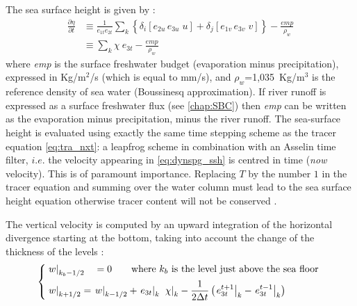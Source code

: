 \documentclass[../tex_main/NEMO_manual]{subfiles}
\begin{document}
The sea surface height is given by :
\begin{equation} \label{eq:dynspg_ssh}
\begin{aligned}
\frac{\partial \eta }{\partial t}
&\equiv    \frac{1}{e_{1t} e_{2t} }\sum\limits_k { \left\{  \delta _i \left[ {e_{2u}\,e_{3u}\;u} \right]
                                                                                  +\delta _j \left[ {e_{1v}\,e_{3v}\;v} \right]  \right\} } 
           -    \frac{\textit{emp}}{\rho _w }   \\
&\equiv    \sum\limits_k {\chi \ e_{3t}}  -  \frac{\textit{emp}}{\rho _w }
\end{aligned}
\end{equation}
where \textit{emp} is the surface freshwater budget (evaporation minus precipitation), 
expressed in Kg/m$^2$/s (which is equal to mm/s), and $\rho _w$=1,035~Kg/m$^3$ 
is the reference density of sea water (Boussinesq approximation). If river runoff is 
expressed as a surface freshwater flux (see \autoref{chap:SBC}) then \textit{emp} can be 
written as the evaporation minus precipitation, minus the river runoff. 
The sea-surface height is evaluated using exactly the same time stepping scheme 
as the tracer equation \autoref{eq:tra_nxt}: 
a leapfrog scheme in combination with an Asselin time filter, $i.e.$ the velocity appearing 
in \autoref{eq:dynspg_ssh} is centred in time (\textit{now} velocity). 
This is of paramount importance. Replacing $T$ by the number $1$ in the tracer equation and summing
over the water column must lead to the sea surface height equation otherwise tracer content
will not be conserved \citep{Griffies_al_MWR01, Leclair_Madec_OM09}.

The vertical velocity is computed by an upward integration of the horizontal 
divergence starting at the bottom, taking into account the change of the thickness of the levels :
\begin{equation} \label{eq:wzv}
\left\{   \begin{aligned}
&\left. w \right|_{k_b-1/2} \quad= 0    \qquad \text{where } k_b \text{ is the level just above the sea floor }  	\\
&\left. w \right|_{k+1/2}     = \left. w \right|_{k-1/2}  +  \left. e_{3t} \right|_{k}\;  \left. \chi \right|_k  
                                         - \frac{1} {2 \Delta t} \left(  \left. e_{3t}^{t+1}\right|_{k} - \left. e_{3t}^{t-1}\right|_{k}\right)
\end{aligned}   \right.
\end{equation}
\end{document}

